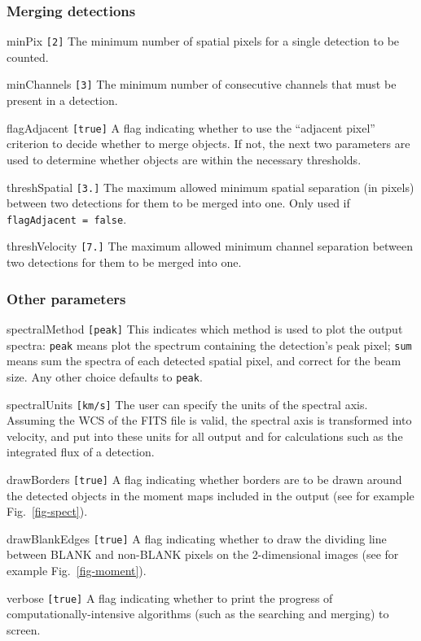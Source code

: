\documentclass[12pt,a4paper]{article}
\newcommand{\entrylabel}[1]{\mbox{\textsf{\bf{#1:}}}\hfil}
\newenvironment{entry}
        {\begin{list}{}%
                {\renewcommand{\makelabel}{\entrylabel}%
                        \setlength{\labelwidth}{30mm}%
                        \setlength{\labelsep}{5pt}%
                        \setlength{\itemsep}{2pt}%
                        \setlength{\parsep}{2pt}%
                        \setlength{\leftmargin}{35mm}%
                }%
        }%
{\end{list}}
\begin{document}
\subsubsection*{Merging detections}
\begin{entry}
\item[minPix \texttt{[2]}] The minimum number of spatial pixels for a single
  detection to be counted.
\item[minChannels \texttt{[3]}] The minimum number of consecutive
  channels that must be present in a detection.
\item[flagAdjacent \texttt{[true]}] A flag indicating whether to use the
  ``adjacent pixel'' criterion to decide whether to merge objects. If
  not, the next two parameters are used to determine whether objects
  are within the necessary thresholds.
\item[threshSpatial \texttt{[3.]}] The maximum allowed minimum spatial
  separation (in pixels) between two detections for them to be merged
  into one. Only used if \texttt{flagAdjacent = false}.
\item[threshVelocity \texttt{[7.]}] The maximum allowed minimum channel
  separation between two detections for them to be merged into
  one. 
\end{entry}

\subsubsection*{Other parameters}
\begin{entry}
\item[spectralMethod \texttt{[peak]}] This indicates which method is used
  to plot the output spectra: \texttt{peak} means plot the spectrum
  containing the detection's peak pixel; \texttt{sum} means sum the
  spectra of each detected spatial pixel, and correct for the beam
  size. Any other choice defaults to \texttt{peak}.
\item[spectralUnits \texttt{[km/s]}] The user can specify the units of
  the spectral axis. Assuming the WCS of the FITS file is valid, the
  spectral axis is transformed into velocity, and put into these units
  for all output and for calculations such as the integrated flux of a
  detection.
\item[drawBorders \texttt{[true]}] A flag indicating whether borders
  are to be drawn around the detected objects in the moment maps
  included in the output (see for example Fig.~\ref{fig-spect}).
\item[drawBlankEdges \texttt{[true]}] A flag indicating whether to
 draw the dividing line between BLANK and non-BLANK pixels on the
 2-dimensional images (see for example Fig.~\ref{fig-moment}).
\item[verbose \texttt{[true]}] A flag indicating whether to print the
  progress of computationally-intensive algorithms (such as the
  searching and merging) to screen.
\end{entry}
\end{document}
